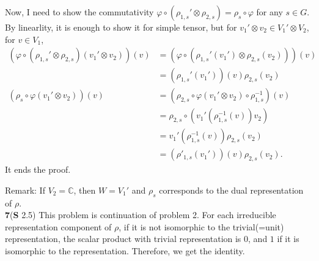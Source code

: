\documentclass[a4paper, 12pt]{article}
\theoremstyle{Mydefinition}
\theoremstyle{Mytheorem}
\begin{document}
Now, I need to show the commutativity $\varphi\circ \left(\rho_{1,s}'\otimes \rho_{2,s}\right) =\rho_s\circ \varphi$ for any $s\in G$. By linearlity, it is enough to show it for simple tensor, but for $v_1'\otimes v_2\in V_1'\otimes V_2$, for $v\in V_1$,
\begin{equation}
    \begin{split}
        \left(\varphi\circ \left(\rho_{1,s}'\otimes \rho_{2,s}\right)(v_1'\otimes v_2)\right)(v) &= \left(\varphi\circ \left(\rho_{1,s}'(v_1')\otimes \rho_{2,s}(v_2)\right)\right)(v)\\
        &=\left(\rho_{1,s}'(v_1')\right)(v)\rho_{2,s}(v_2)\\
        \left(\rho_s\circ \varphi(v_1'\otimes v_2)\right)(v) &=\left(\rho_{2,s}\circ \varphi(v_1'\otimes v_2)\circ \rho_{1,s}^{-1}\right)(v)\\
        &=\rho_{2,s}\circ \left(v_1'(\rho_{1,s}^{-1}(v))v_2\right)\\
        &=v_1'(\rho_{1,s}^{-1}(v))\rho_{2,s}(v_2)\\
        &=\left(\rho'_{1,s}(v_1')\right)(v)\rho_{2,s}(v_2).
    \end{split}
\end{equation}
It ends the proof.

Remark: If $V_2=\mathbb{C}$, then $W=V_1'$ and $\rho_s$ corresponds to the dual representation of $\rho$.\\

\noindent \textbf{7}(\textbf{S} 2.5)
This problem is continuation of problem 2. For each irreducible representation component of $\rho$, if it is not isomorphic to the trivial(=unit) representation, the scalar product with trivial representation is $0$, and $1$ if it is isomorphic to the representation. Therefore, we get the identity.\\
\end{document}
